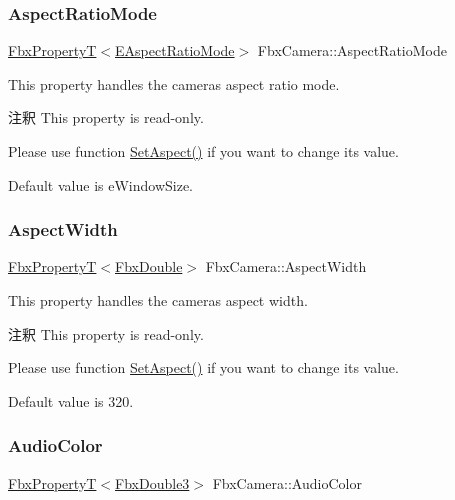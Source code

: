 \subsubsection{\texorpdfstring{Aspect\+Ratio\+Mode}{AspectRatioMode}}
{\footnotesize\ttfamily \hyperlink{class_fbx_property_t}{Fbx\+PropertyT}$<$\hyperlink{class_fbx_camera_a2135478bb5fd6985835c14b11e1fccda}{E\+Aspect\+Ratio\+Mode}$>$ Fbx\+Camera\+::\+Aspect\+Ratio\+Mode}

This property handles the camera\textquotesingle{}s aspect ratio mode.

\begin{DoxyRemark}{注釈}
This property is read-\/only. 

Please use function \hyperlink{class_fbx_camera_adb9cf67e4b59463add6a052003797392}{Set\+Aspect()} if you want to change its value.
\end{DoxyRemark}
Default value is e\+Window\+Size. \mbox{\label{class_fbx_camera_ada3746eb834815c224eb5fc223fa35ac}} 
\subsubsection{\texorpdfstring{Aspect\+Width}{AspectWidth}}
{\footnotesize\ttfamily \hyperlink{class_fbx_property_t}{Fbx\+PropertyT}$<$\hyperlink{fbxtypes_8h_a171e72a1c46fc15c1a6c9c31948c1c5b}{Fbx\+Double}$>$ Fbx\+Camera\+::\+Aspect\+Width}

This property handles the camera\textquotesingle{}s aspect width.

\begin{DoxyRemark}{注釈}
This property is read-\/only. 

Please use function \hyperlink{class_fbx_camera_adb9cf67e4b59463add6a052003797392}{Set\+Aspect()} if you want to change its value.
\end{DoxyRemark}
Default value is 320. \mbox{\label{class_fbx_camera_a39719d29cec7526134a1856a8c8e1995}} 
\subsubsection{\texorpdfstring{Audio\+Color}{AudioColor}}
{\footnotesize\ttfamily \hyperlink{class_fbx_property_t}{Fbx\+PropertyT}$<$\hyperlink{fbxtypes_8h_ae0a96f14cde566774c7553aa7523b7a7}{Fbx\+Double3}$>$ Fbx\+Camera\+::\+Audio\+Color}

